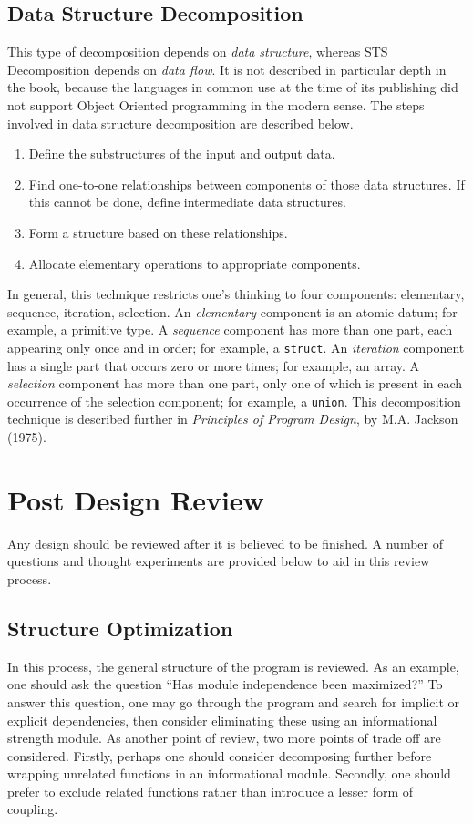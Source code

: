 \documentclass[format.tex]{subfiles}
\begin{document}
\subsection{Data Structure Decomposition}
This type of decomposition depends on {\it data structure}, whereas STS
Decomposition depends on {\it data flow}. It is not described in particular
depth in the book, because the languages in common use at the time of its
publishing did not support Object Oriented programming in the modern sense. The
steps involved in data structure decomposition are described below.
\begin{enumerate}
\item Define the substructures of the input and output data.
\item Find one-to-one relationships between components of those data
  structures. If this cannot be done, define intermediate data structures.
\item Form a structure based on these relationships.
\item Allocate elementary operations to appropriate components.
\end{enumerate}
In general, this technique restricts one's thinking to four components: elementary, sequence, iteration, selection. An {\it elementary} component is an atomic
datum; for example, a primitive type. A {\it sequence} component has more than
one part, each appearing only once and in order; for example, a
\texttt{struct}. An {\it iteration} component has a single part that occurs
zero or more times; for example, an array. A {\it selection} component has more
than one part, only one of which is present in each occurrence of the selection
component; for example, a \texttt{union}. This decomposition technique is
described further in {\it Principles of Program Design}, by M.A. Jackson
(1975).

\section{Post Design Review}
Any design should be reviewed after it is believed to be finished. A number of
questions and thought experiments are provided below to aid in this review
process.

\subsection{Structure Optimization}
In this process, the general structure of the program is reviewed. As an
example, one should ask the question ``Has module independence been
maximized?'' To answer this question, one may go through the program and search
for implicit or explicit dependencies, then consider eliminating these using an
informational strength module. As another point of review, two more points of
trade off are considered. Firstly, perhaps one should consider decomposing
further before wrapping unrelated functions in an informational module.
Secondly, one should prefer to exclude related functions rather than introduce
a lesser form of coupling.
\end{document}
